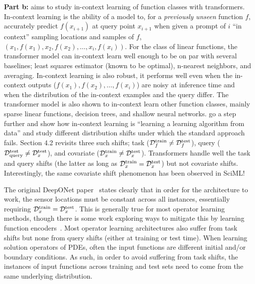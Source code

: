 {\bf Part b:} \citep{garg2022can} aims to study in-context learning of function classes with transformers. In-context learning is the ability of a model to, for a {\it previously unseen} function $f$, accurately predict $f(x_{i+1})$ at query point $x_{i+1}$ when given a prompt of $i$ ``in context'' sampling locations and samples of $f$, $\left(x_1, f(x_1), x_2, f(x_2), \dots, x_i, f(x_i) \right)$. For the class of linear functions, the transformer model can in-context learn well enough to be on par with several baselines; least squares estimator (known to be optimal), n-nearest neighbors, and averaging. In-context learning is also robust, it performs well even when the in-context outputs ($f(x_1), f(x_2), \dots, f(x_i)$) are noisy at inference time and when the distribution of the in-context examples and the query differ. The transformer model is also shown to in-context learn other function classes, mainly sparse linear functions, decision trees, and shallow neural networks. \citep{zhang2024trained} go a step further and show how in-context learning is ``learning a learning algorithm from data'' and study different distribution shifts under which the standard approach fails. Section 4.2 revisits three such shifts; task ($\mathcal{D}_{f}^{\text{train}} \neq \mathcal{D}_{f}^{\text{test}}$), query ($\mathcal{D}_{\text{query}}^{\text{test}} \neq \mathcal{D}_{x}^{\text{test}}$), and covariate ($\mathcal{D}_{x}^{\text{train}} \neq \mathcal{D}_{x}^{\text{test}}$). Transformers handle well the task and query shifts (the latter as long as $\mathcal{D}_{x}^{\text{train}} = \mathcal{D}_{x}^{\text{test}}$) but not covariate shifts. Interestingly, the same covariate shift phenomenon has been observed in SciML!

The original DeepONet paper~\citep{lu2019deeponet} states clearly that in order for the architecture to work, the sensor locations must be constant across all instances, essentially requiring $\mathcal{D}_{x}^{\text{train}} = \mathcal{D}_{x}^{\text{test}}$. This is generally true for most operator learning methods, though there is some work exploring ways to mitigate this by learning function encoders~\citep{ingebrand2025basis}. Most operator learning architectures also suffer from task shifts but none from query shifts (either at training or test time). When learning solution operators of PDEs, often the input functions are different initial and/or boundary conditions. As such, in order to avoid suffering from task shifts, the instances of input functions across training and test sets need to come from the same underlying distribution.
\pagebreak
